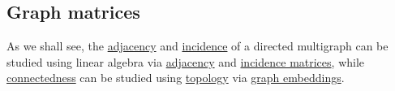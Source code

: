 \subsection{Graph matrices}\label{subsec:graph_matrices}

\begin{remark}\label{rem:graphs_linear_algebra_and_topology}
  As we shall see, the \hyperref[def:graph_adjacency]{adjacency} and \hyperref[def:graph_incidence]{incidence} of a directed multigraph can be studied using linear algebra via \hyperref[def:graph_adjacency_matrix]{adjacency} and \hyperref[def:directed_incidence_matrix]{incidence matrices}, while \hyperref[def:graph_connectedness]{connectedness} can be studied using \hyperref[def:graph_connectedness]{topology} via \hyperref[def:graph_geometric_realization/embedding]{graph embeddings}.
\end{remark}

